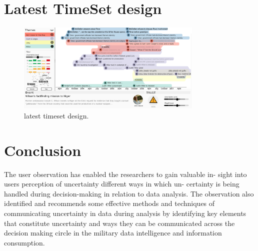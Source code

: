 \documentclass[journal]{vgtc}                %
\begin{document}
\section{Latest TimeSet design}

\begin{figure}[htb]
 \centering
 \includegraphics[width=3.5in]{img/timeset}
 \caption{latest timeset design.}
\end{figure}

\section{Conclusion}
The user observation has enabled the researchers to gain valuable in- sight into users perception of uncertainty different ways in which un- certainty is being handled during decision-making in relation to data analysis. The observation also identified and recommends some effective methods and techniques of communicating uncertainty in data during analysis by identifying key elements that constitute uncertainty and ways they can be communicated across the decision making circle in the military data intelligence and information consumption. 




\end{document}
